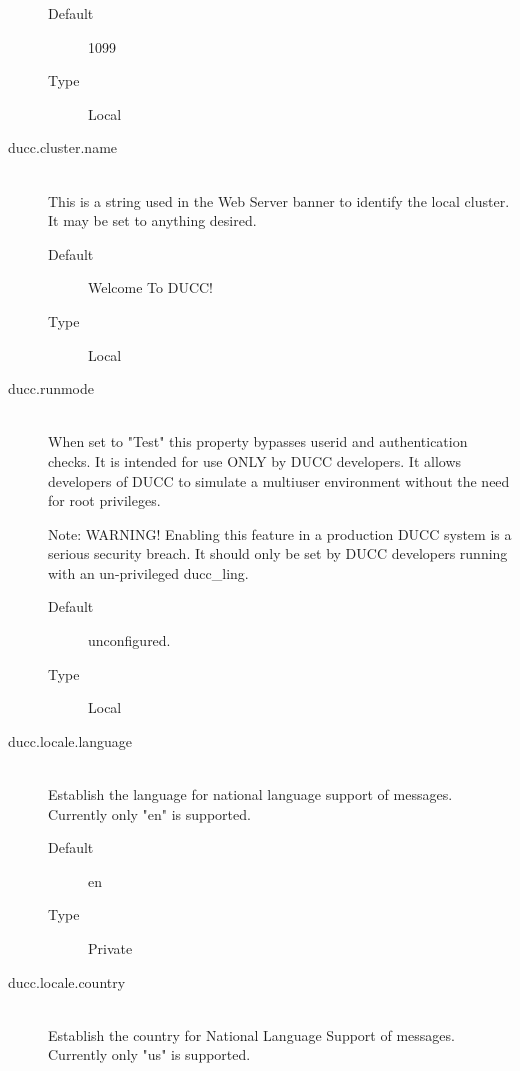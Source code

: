 \begin{description}
         \begin{description}         
           \item[Default] 1099                       
           \item[Type] Local 
         \end{description}
           

       \item[ducc.cluster.name] \hfill \\
         This is a string used in the Web Server banner to identify the local cluster. It may be set to 
         anything desired. 
         \begin{description}
           \item[Default] Welcome To DUCC! 
           \item[Type] Local 
         \end{description}
           
       \item[ducc.runmode] \hfill \\
         When set to "Test" this property bypasses userid and authentication checks. It is intended 
         for use ONLY by DUCC developers. It allows developers of DUCC to simulate a multiuser 
         environment without the need for root privileges. 
         
         Note: WARNING! Enabling this feature in a production DUCC system is a 
         serious security breach. It should only be set by DUCC developers running with 
         an un-privileged ducc\_ling. 
         \begin{description}
           \item[Default] unconfigured. 
           \item[Type] Local 
         \end{description}

       \item[ducc.locale.language] \hfill \\
         Establish the language for national language support of messages. Currently only "en" is 
         supported. 
         \begin{description}
           \item[Default] en 
           \item[Type] Private 
         \end{description}
           

       \item[ducc.locale.country] \hfill \\
         Establish the country for National Language Support of messages. Currently only "us" is 
         supported. 


\end{description}
